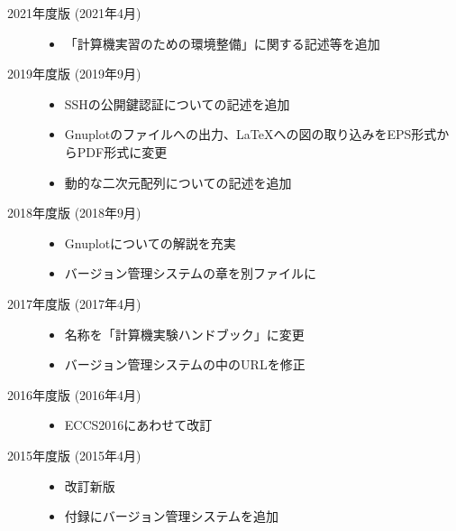 \begin{description}
    \item[2021年度版 (2021年4月)] \mbox{}

          \begin{itemize}
              \item 「計算機実習のための環境整備」に関する記述等を追加
          \end{itemize}

    \item[2019年度版 (2019年9月)] \mbox{}

          \begin{itemize}
              \item SSHの公開鍵認証についての記述を追加
              \item Gnuplotのファイルへの出力、\LaTeX への図の取り込みをEPS形式からPDF形式に変更
              \item 動的な二次元配列についての記述を追加
          \end{itemize}

    \item[2018年度版 (2018年9月)] \mbox{}

          \begin{itemize}
              \item Gnuplotについての解説を充実
              \item バージョン管理システムの章を別ファイルに
          \end{itemize}

    \item[2017年度版 (2017年4月)] \mbox{}

          \begin{itemize}
              \item 名称を「計算機実験ハンドブック」に変更
              \item バージョン管理システムの中のURLを修正
          \end{itemize}

    \item[2016年度版 (2016年4月)] \mbox{}

          \begin{itemize}
              \item ECCS2016にあわせて改訂
          \end{itemize}

    \item[2015年度版 (2015年4月)] \mbox{}

          \begin{itemize}
              \item 改訂新版
              \item 付録にバージョン管理システムを追加
          \end{itemize}

\end{description}

